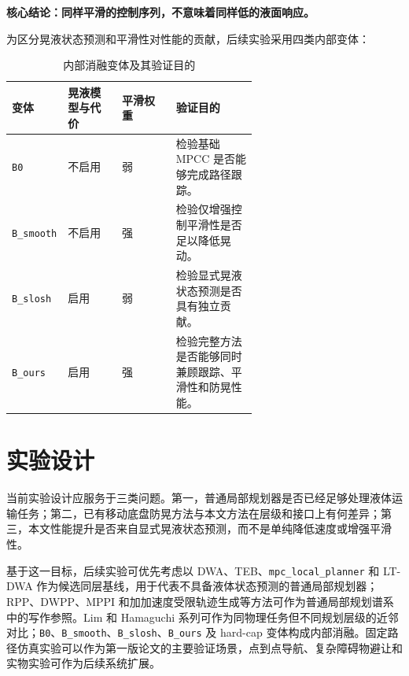 \documentclass[12pt,a4paper]{ctexart}
\newcommand{\MPCC}{MPCC}
\newcommand{\DWA}{DWA}
\newcommand{\TEB}{TEB}
\newcommand{\DWPP}{DWPP}
\begin{document}
\medskip
\noindent\textbf{核心结论：同样平滑的控制序列，不意味着同样低的液面响应。}

为区分晃液状态预测和平滑性对性能的贡献，后续实验采用四类内部变体：
\begin{table}[htbp]
  \centering
  \small
  \caption{内部消融变体及其验证目的}
  \begin{tabularx}{\linewidth}{p{0.18\linewidth}p{0.22\linewidth}p{0.22\linewidth}Y}
    \toprule
    变体 & 晃液模型与代价 & 平滑权重 & 验证目的 \\
    \midrule
    \texttt{B0} & 不启用 & 弱 & 检验基础 \MPCC{} 是否能够完成路径跟踪。 \\
    \texttt{B\_smooth} & 不启用 & 强 & 检验仅增强控制平滑性是否足以降低晃动。 \\
    \texttt{B\_slosh} & 启用 & 弱 & 检验显式晃液状态预测是否具有独立贡献。 \\
    \texttt{B\_ours} & 启用 & 强 & 检验完整方法是否能够同时兼顾跟踪、平滑性和防晃性能。 \\
    \bottomrule
  \end{tabularx}
\end{table}

\section{实验设计}
\label{sec:experiment-rationale}

当前实验设计应服务于三类问题。第一，普通局部规划器是否已经足够处理液体运输任务；第二，已有移动底盘防晃方法与本文方法在层级和接口上有何差异；第三，本文性能提升是否来自显式晃液状态预测，而不是单纯降低速度或增强平滑性。

基于这一目标，后续实验可优先考虑以 \DWA{}、\TEB{}、\texttt{mpc\_local\_planner} 和 LT-DWA 作为候选同层基线，用于代表不具备液体状态预测的普通局部规划器；RPP、\DWPP{}、MPPI 和加加速度受限轨迹生成等方法可作为普通局部规划谱系中的写作参照。Lim 和 Hamaguchi 系列可作为同物理任务但不同规划层级的近邻对比；\texttt{B0}、\texttt{B\_smooth}、\texttt{B\_slosh}、\texttt{B\_ours} 及 hard-cap 变体构成内部消融。固定路径仿真实验可以作为第一版论文的主要验证场景，点到点导航、复杂障碍物避让和实物实验可作为后续系统扩展。
\end{document}
